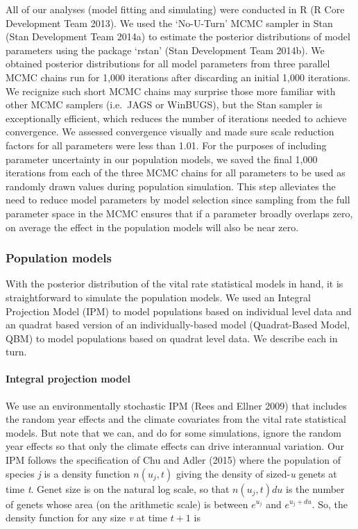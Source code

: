 \documentclass[12pt,]{article}
\begin{document}
All of our analyses (model fitting and simulating) were conducted in R
(R Core Development Team 2013). We used the `No-U-Turn' MCMC sampler in
Stan (Stan Development Team 2014a) to estimate the posterior
distributions of model parameters using the package `rstan' (Stan
Development Team 2014b). We obtained posterior distributions for all
model parameters from three parallel MCMC chains run for 1,000
iterations after discarding an initial 1,000 iterations. We recignize
such short MCMC chains may surprise those more familiar with other MCMC
samplers (i.e.~JAGS or WinBUGS), but the Stan sampler is exceptionally
efficient, which reduces the number of iterations needed to achieve
convergence. We assessed convergence visually and made sure scale
reduction factors for all parameters were less than 1.01. For the
purposes of including parameter uncertainty in our population models, we
saved the final 1,000 iterations from each of the three MCMC chains for
all parameters to be used as randomly drawn values during population
simulation. This step alleviates the need to reduce model parameters by
model selection since sampling from the full parameter space in the MCMC
ensures that if a parameter broadly overlaps zero, on average the effect
in the population models will also be near zero.

\subsubsection{Population models}\label{population-models}

With the posterior distribution of the vital rate statistical models in
hand, it is straightforward to simulate the population models. We used
an Integral Projection Model (IPM) to model populations based on
individual level data and an quadrat based version of an
individually-based model (Quadrat-Based Model, QBM) to model populations
based on quadrat level data. We describe each in turn.

\paragraph{Integral projection model}\label{integral-projection-model}

We use an environmentally stochastic IPM (Rees and Ellner 2009) that
includes the random year effects and the climate covariates from the
vital rate statistical models. But note that we can, and do for some
simulations, ignore the random year effects so that only the climate
effects can drive interannual variation. Our IPM follows the
specification of Chu and Adler (2015) where the population of species
\emph{j} is a density function $n(u_{j},t)$ giving the density of
sized-\emph{u} genets at time \emph{t}. Genet size is on the natural log
scale, so that $n(u_{j},t)du$ is the number of genets whose area (on the
arithmetic scale) is between $e^{u_{j}}$ and $e^{u_{j}+du}$. So, the
density function for any size \emph{v} at time $t+1$ is
\end{document}
